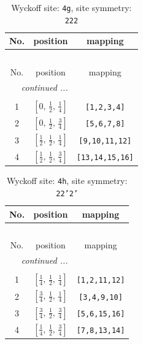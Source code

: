 \documentclass[fleqn,8pt]{jsarticle}
\begin{document}
\renewcommand{\arraystretch}{1.2}
\begin{longtable}{ccc}
\caption{Wyckoff site: {\tt 4g}, site symmetry: {\tt 222}}
 \\
 \hline \hline
No. & position & mapping \\ \hline \endfirsthead

\multicolumn{2}{l}{\tablename\ \thetable{}} \\
 \hline \hline
No. & position & mapping \\ \hline \endhead

 \hline \hline
\multicolumn{2}{r}{\footnotesize\it continued ...} \\ \endfoot

 \hline \hline
\multicolumn{2}{r}{} \\ \endlastfoot

1 & $\left[ 0,\, \frac{1}{2},\, \frac{1}{4} \right]$ & {\tt [1,2,3,4]} \\ \hline
2 & $\left[ 0,\, \frac{1}{2},\, \frac{3}{4} \right]$ & {\tt [5,6,7,8]} \\ \hline
3 & $\left[ \frac{1}{2},\, \frac{1}{2},\, \frac{1}{4} \right]$ & {\tt [9,10,11,12]} \\ \hline
4 & $\left[ \frac{1}{2},\, \frac{1}{2},\, \frac{3}{4} \right]$ & {\tt [13,14,15,16]} \\
\end{longtable}
\renewcommand{\arraystretch}{1.2}
\begin{longtable}{ccc}
\caption{Wyckoff site: {\tt 4h}, site symmetry: {\tt 22'2'}}
 \\
 \hline \hline
No. & position & mapping \\ \hline \endfirsthead

\multicolumn{2}{l}{\tablename\ \thetable{}} \\
 \hline \hline
No. & position & mapping \\ \hline \endhead

 \hline \hline
\multicolumn{2}{r}{\footnotesize\it continued ...} \\ \endfoot

 \hline \hline
\multicolumn{2}{r}{} \\ \endlastfoot

1 & $\left[ \frac{1}{4},\, \frac{1}{2},\, \frac{1}{4} \right]$ & {\tt [1,2,11,12]} \\ \hline
2 & $\left[ \frac{3}{4},\, \frac{1}{2},\, \frac{1}{4} \right]$ & {\tt [3,4,9,10]} \\ \hline
3 & $\left[ \frac{3}{4},\, \frac{1}{2},\, \frac{3}{4} \right]$ & {\tt [5,6,15,16]} \\ \hline
4 & $\left[ \frac{1}{4},\, \frac{1}{2},\, \frac{3}{4} \right]$ & {\tt [7,8,13,14]} \\
\end{longtable}
\end{document}
